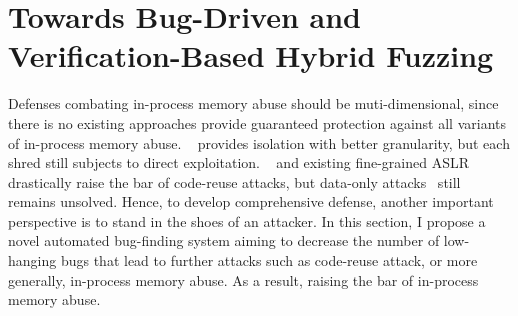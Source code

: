 \newcommand{\afl}{{\sc AFL}\xspace}
\newcommand{\aflgo}{{\sc AFLGo}\xspace}
\newcommand{\tfuzz}{{\sc TFuzz}\xspace}
\newcommand{\angora}{{\sc Angora}\xspace}
\newcommand{\driller}{{\sc Driller}\xspace}
\newcommand{\qsym}{{\sc QSYM}\xspace}
\section{Towards Bug-Driven and Verification-Based Hybrid Fuzzing}
Defenses combating in-process memory abuse should be muti-dimensional, since there is no existing approaches provide guaranteed protection against all variants of in-process memory abuse. \shreds~\cite{shreds} provides isolation with better granularity, but each shred still subjects to direct exploitation. \norax~\cite{norax} and existing fine-grained ASLR~\cite{ccr} drastically raise the bar of code-reuse attacks, but data-only attacks~\cite{dop} still remains unsolved.
Hence, to develop comprehensive defense, another important perspective is to stand in the shoes of an attacker. In this section, I propose a novel automated bug-finding system aiming to decrease the number of low-hanging bugs that lead to further attacks such as code-reuse attack, or more generally, in-process memory abuse. As a result, raising the bar of in-process memory abuse.








